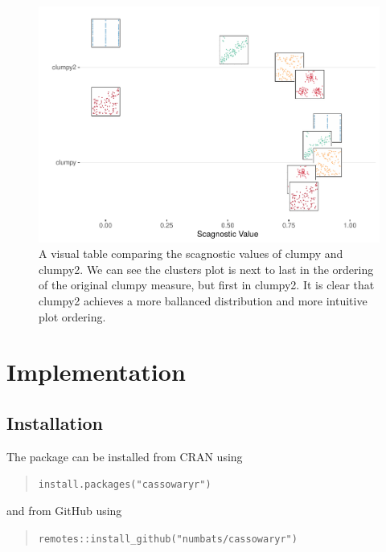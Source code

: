 \begin{Schunk}
\begin{figure}
\includegraphics[width=1\linewidth]{mason-lee-laa-cook_files/figure-latex/clumpy-vtable-1} \caption[A visual table comparing the scagnostic values of clumpy and clumpy2]{A visual table comparing the scagnostic values of clumpy and clumpy2. We can see the clusters plot is next to last in the ordering of the original clumpy measure, but first in clumpy2. It is clear that clumpy2 achieves a more ballanced distribution and more intuitive plot ordering.}\label{fig:clumpy-vtable}
\end{figure}
\end{Schunk}

\hypertarget{implementation}{%
\section{Implementation}\label{implementation}}

\hypertarget{installation}{%
\subsection{Installation}\label{installation}}

The package can be installed from CRAN using

\begin{quote}
\texttt{install.packages("cassowaryr")}
\end{quote}

and from GitHub using

\begin{quote}
\texttt{remotes::install\_github("numbats/cassowaryr")}
\end{quote}

